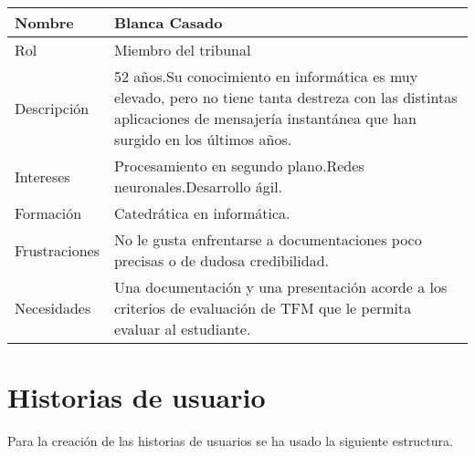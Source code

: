 \label{sec:personaMiembroTribunal}
\begin{table}[H]
    \centering
    \begin{adjustbox}{max width=\textwidth}
    \begin{tabularx}{\textwidth}{|l|L|}
    \hline
        Nombre & Blanca Casado \\ \hline
        Rol & Miembro del tribunal \\ \hline
        Descripción & 52 años.\linebreak Su conocimiento en informática es muy elevado, pero no tiene tanta destreza con las distintas aplicaciones de mensajería instantánea que han surgido en los últimos años. \\ \hline
        Intereses & Procesamiento en segundo plano.\linebreak Redes neuronales.\linebreak Desarrollo ágil. \\ \hline
        Formación & Catedrática en informática. \\ \hline
        Frustraciones & No le gusta enfrentarse a documentaciones poco precisas o de dudosa credibilidad. \\ \hline
        Necesidades & Una documentación y una presentación acorde a los criterios de evaluación de TFM que le permita evaluar al estudiante. \\ \hline
    \end{tabularx}
    \end{adjustbox}
\end{table}

\section{Historias de usuario}

Para la creación de las historias de usuarios se ha usado la siguiente estructura.

